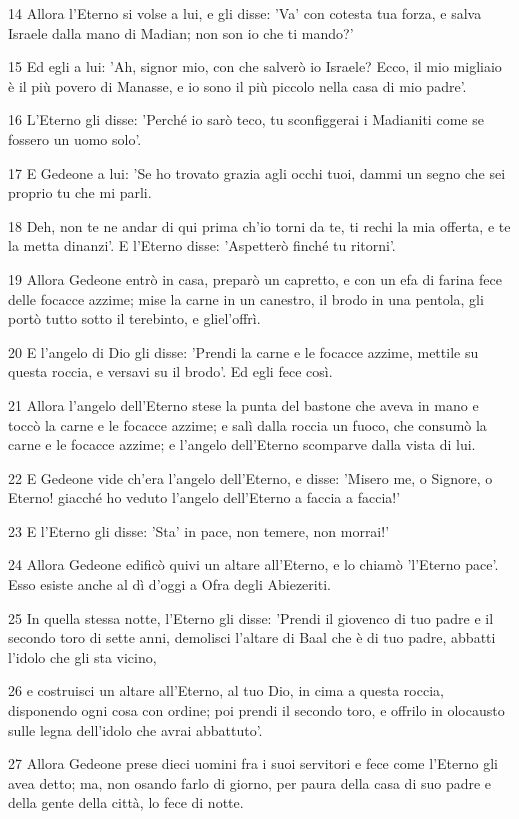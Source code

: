 \par 14 Allora l'Eterno si volse a lui, e gli disse: 'Va' con cotesta tua forza, e salva Israele dalla mano di Madian; non son io che ti mando?'
\par 15 Ed egli a lui: 'Ah, signor mio, con che salverò io Israele? Ecco, il mio migliaio è il più povero di Manasse, e io sono il più piccolo nella casa di mio padre'.
\par 16 L'Eterno gli disse: 'Perché io sarò teco, tu sconfiggerai i Madianiti come se fossero un uomo solo'.
\par 17 E Gedeone a lui: 'Se ho trovato grazia agli occhi tuoi, dammi un segno che sei proprio tu che mi parli.
\par 18 Deh, non te ne andar di qui prima ch'io torni da te, ti rechi la mia offerta, e te la metta dinanzi'. E l'Eterno disse: 'Aspetterò finché tu ritorni'.
\par 19 Allora Gedeone entrò in casa, preparò un capretto, e con un efa di farina fece delle focacce azzime; mise la carne in un canestro, il brodo in una pentola, gli portò tutto sotto il terebinto, e gliel'offrì.
\par 20 E l'angelo di Dio gli disse: 'Prendi la carne e le focacce azzime, mettile su questa roccia, e versavi su il brodo'. Ed egli fece così.
\par 21 Allora l'angelo dell'Eterno stese la punta del bastone che aveva in mano e toccò la carne e le focacce azzime; e salì dalla roccia un fuoco, che consumò la carne e le focacce azzime; e l'angelo dell'Eterno scomparve dalla vista di lui.
\par 22 E Gedeone vide ch'era l'angelo dell'Eterno, e disse: 'Misero me, o Signore, o Eterno! giacché ho veduto l'angelo dell'Eterno a faccia a faccia!'
\par 23 E l'Eterno gli disse: 'Sta' in pace, non temere, non morrai!'
\par 24 Allora Gedeone edificò quivi un altare all'Eterno, e lo chiamò 'l'Eterno pace'. Esso esiste anche al dì d'oggi a Ofra degli Abiezeriti.
\par 25 In quella stessa notte, l'Eterno gli disse: 'Prendi il giovenco di tuo padre e il secondo toro di sette anni, demolisci l'altare di Baal che è di tuo padre, abbatti l'idolo che gli sta vicino,
\par 26 e costruisci un altare all'Eterno, al tuo Dio, in cima a questa roccia, disponendo ogni cosa con ordine; poi prendi il secondo toro, e offrilo in olocausto sulle legna dell'idolo che avrai abbattuto'.
\par 27 Allora Gedeone prese dieci uomini fra i suoi servitori e fece come l'Eterno gli avea detto; ma, non osando farlo di giorno, per paura della casa di suo padre e della gente della città, lo fece di notte.
